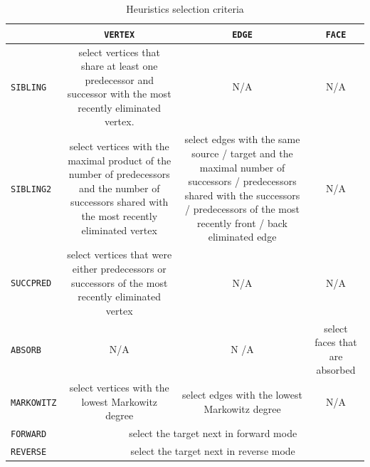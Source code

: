\documentclass{book}
\newcommand{\code}[1]{{\small\tt{#1}}}
\begin{document}
\begin{table}[htb]
  \begin{tabular}{|l|c|c|c|}\hline
    & \code{VERTEX} & \code{EDGE} & \code{FACE} 
    \\\hline %
    \code{SIBLING} 
    &
    \begin{minipage}{.4\linewidth}
      \footnotesize
      select vertices that share at least one predecessor
      and successor with the most recently eliminated vertex.
    \end{minipage}
    & N/A & N/A
    \\\hline %
    \code{SIBLING2} 
    &
    \begin{minipage}{.4\linewidth}
      \footnotesize
      select vertices with the maximal product of 
      the number of predecessors and the number of 
      successors shared with the most recently eliminated vertex
    \end{minipage}
    &
    \begin{minipage}{.2\linewidth}
      \footnotesize
      select edges with the same source / target and the 
      maximal number of successors / predecessors shared with the 
      successors / predecessors of 
      the most recently front / back eliminated edge
    \end{minipage}
    & N/A 
    \\\hline  %
    \code{SUCCPRED} 
    &
    \begin{minipage}{.4\linewidth}
      \footnotesize
      select vertices  that were either predecessors or successors of
      the most recently eliminated vertex
    \end{minipage}
    & N/A & N/A 
    \\\hline %
    \code{ABSORB} 
    & N/A & N /A &
    \begin{minipage}{.2\linewidth}
      select faces that are absorbed
    \end{minipage}
    \\\hline %
    \code{MARKOWITZ} 
    &
    \begin{minipage}{.4\linewidth}
      \footnotesize
      select vertices with  the lowest Markowitz degree
    \end{minipage}
    &
    \begin{minipage}{.2\linewidth}
      \footnotesize
      select edges with the lowest Markowitz degree
    \end{minipage}
    &
    N/A
    \\\hline %
    \code{FORWARD} 
    &\multicolumn{3}{c|}{
      select the target next in forward mode
    }
    \\\hline %
    \code{REVERSE} 
    &\multicolumn{3}{c|}{
      select the target next in reverse mode
    }
    \\\hline %
  \end{tabular}
  \caption{Heuristics selection criteria}\label{tab:memOpsHeur}
\end{table}
\end{document}
